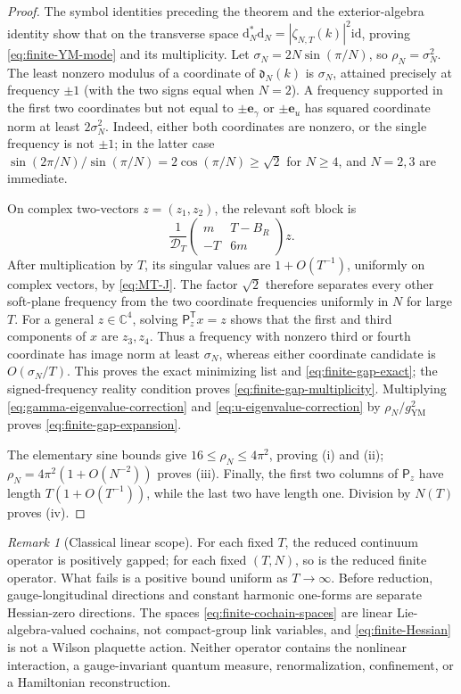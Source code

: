 \documentclass[11pt]{article}
\numberwithin{equation}{section}
\theoremstyle{definition}
\theoremstyle{remark}
\newtheorem{remark}[theorem]{Remark}
\newcommand{\C}{\mathbb C}
\newcommand{\dd}{\mathrm d}
\newcommand{\id}{\mathrm{id}}
\begin{document}
\begin{proof}
The symbol identities preceding the theorem and the exterior-algebra
identity show that on the transverse space
$\dd_N^*\dd_N=|\zeta_{N,T}(k)|^2\id$, proving
\eqref{eq:finite-YM-mode} and its multiplicity.  Let
$\sigma_N=2N\sin(\pi/N)$, so $\rho_N=\sigma_N^2$.  The least nonzero modulus
of a coordinate of $\mathfrak d_N(k)$ is $\sigma_N$, attained precisely at
frequency $\pm1$ (with the two signs equal when $N=2$).  A frequency supported
in the first two coordinates but not equal to
$\pm\mathbf e_\gamma$ or $\pm\mathbf e_u$ has squared coordinate norm at
least $2\sigma_N^2$.  Indeed, either both coordinates are nonzero, or the
single frequency is not $\pm1$; in the latter case
$\sin(2\pi/N)/\sin(\pi/N)=2\cos(\pi/N)\ge\sqrt2$ for $N\ge4$, and
$N=2,3$ are immediate.

On complex two-vectors $z=(z_1,z_2)$, the relevant soft block is
\[
 \frac1{\mathcal D_T}
 \begin{pmatrix}m&T-B_R\\-T&6m\end{pmatrix}z.
\]
After multiplication by $T$, its singular values are
$1+O(T^{-1})$, uniformly on complex vectors, by
\eqref{eq:MT-J}.  The factor $\sqrt2$ therefore separates every other
soft-plane frequency from the two coordinate frequencies uniformly in $N$
for large $T$.  For a general $z\in\C^4$, solving
$\mathsf P_z^{\mathsf T}x=z$ shows that the first and third components of
$x$ are $z_3,z_4$.  Thus a frequency with nonzero third or fourth coordinate
has image norm at least $\sigma_N$, whereas either coordinate candidate is
$O(\sigma_N/T)$.  This proves the exact minimizing list and
\eqref{eq:finite-gap-exact}; the signed-frequency reality condition proves
\eqref{eq:finite-gap-multiplicity}.  Multiplying
\eqref{eq:gamma-eigenvalue-correction} and
\eqref{eq:u-eigenvalue-correction} by $\rho_N/g_{\mathrm{YM}}^2$ proves
\eqref{eq:finite-gap-expansion}.

The elementary sine bounds give $16\le\rho_N\le4\pi^2$, proving (i) and
(ii); $\rho_N=4\pi^2(1+O(N^{-2}))$ proves (iii).  Finally, the first two
columns of $\mathsf P_z$ have length $T(1+O(T^{-1}))$, while the last two
have length one.  Division by $N(T)$ proves (iv).
\end{proof}

\begin{remark}[Classical linear scope]
For each fixed $T$, the reduced continuum operator is positively gapped; for
each fixed $(T,N)$, so is the reduced finite operator.  What fails is a
positive bound uniform as $T\to\infty$.  Before reduction, gauge-longitudinal
directions and constant harmonic one-forms are separate Hessian-zero
directions.  The spaces \eqref{eq:finite-cochain-spaces} are linear
Lie-algebra-valued cochains, not compact-group link variables, and
\eqref{eq:finite-Hessian} is not a Wilson plaquette action.  Neither operator
contains the nonlinear interaction, a gauge-invariant quantum measure,
renormalization, confinement, or a Hamiltonian reconstruction.
\end{remark}
\end{document}

